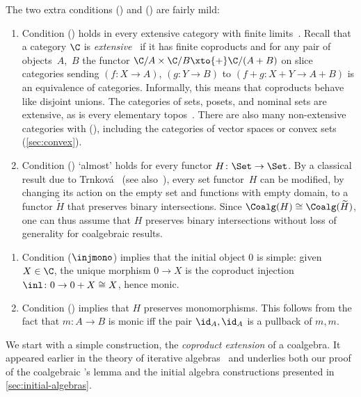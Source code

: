 \begin{rem}\label{rem:conditions}
The two extra conditions (\injmono) and (\hpresint) are fairly mild:
\begin{enumerate}
\item Condition (\injmono) holds in every extensive category with finite limits~\cite[Prop.~3.3]{cw93}. Recall that a category $\C$ is \emph{extensive}~\cite{cw93} if it has finite coproducts and for any pair of objects~$A$,~$B$ the functor $\C/A\times \C/B \xto{+} \C/(A+B)$ on slice categories sending $(f\colon X\to A)$, $(g\colon Y\to B)$ to $(f+g\colon X+Y\to A+B)$ is an equivalence of categories. Informally, this means that coproducts behave like disjoint unions. The categories of sets, posets, and nominal sets are extensive, as is every elementary topos~\cite{Johnstone}. There are also many non-extensive categories with (\injmono), including the categories of vector spaces or convex sets (\autoref{sec:convex}).
\item\label{rem:conditions:set-func-pres-int} Condition (\hpresint) `almost' holds for every functor $H\colon \Set\to \Set$. By a classical result due to Trnkov\'a~\cite{trnkova71} (see also~\cite[Prop.~8.1.13]{amm25}), every set functor~$H$ can be modified, by changing its action on the empty set and functions with empty domain, to a functor $\widetilde{H}$ that preserves binary intersections. Since $\Coalg(H)\cong \Coalg(\widetilde{H})$, one can thus assume that $H$ preserves binary intersections without loss of generality for coalgebraic results.
\end{enumerate} 
\end{rem}

\begin{rem}\label{rem:int-implies-mono}
\begin{enumerate}
\item Condition ($\injmono$) implies that the initial object $0$ is simple: given $X\in \C$, the unique morphism $0\to X$ is the coproduct injection $\inl\colon 0\to 0+X\cong X$, hence monic. 
\item Condition (\hpresint) implies that $H$ preserves monomorphisms. This follows from the fact that $m\colon A\to B$ is monic iff the pair $\id_A,\id_A$ is a pullback of $m,m$.
\end{enumerate}

\end{rem}

We start with a simple construction, the \emph{coproduct extension} of a coalgebra. It appeared earlier in the theory of iterative algebras~\cite{amv06,urbat17} and underlies both our proof of the coalgebraic \Konig's lemma and the initial algebra constructions presented in \autoref{sec:initial-algebras}. 

